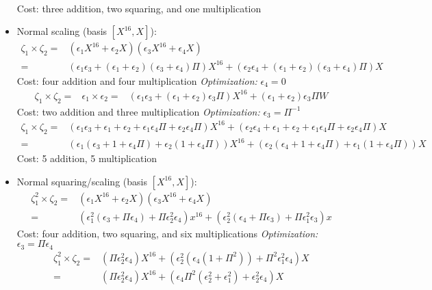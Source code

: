 \begin{itemize}
\begin{align*}
	\end{align*}
	Cost: three addition, two squaring, and one multiplication
	\item Normal scaling (basis $[X^{16}, X]$):
	\begin{align*}
	\zeta_1 \times \zeta_2 = & (\epsilon_1 X^{16} + \epsilon_2 X)(\epsilon_3 X^{16} + \epsilon_4 X) \\
	= & (\epsilon_1\epsilon_3 + (\epsilon_1 + \epsilon_2)(\epsilon_3 + \epsilon_4)\Pi) X^{16} + (\epsilon_2\epsilon_4 + (\epsilon_1 + \epsilon_2)(\epsilon_3 + \epsilon_4)\Pi) X 
	\end{align*}
	Cost: four addition and four multiplication
	\emph{Optimization:} $\epsilon_4 = 0$
	\begin{align*}
	\zeta_1 \times \zeta_2 = & \epsilon_1 \times \epsilon_2 = & (\epsilon_1\epsilon_3 + (\epsilon_1 + \epsilon_2)\epsilon_3\Pi) X^{16} + (\epsilon_1 + \epsilon_2)\epsilon_3\Pi W 
	\end{align*}
	Cost: two addition and three multiplication
	\emph{Optimization:} $\epsilon_3 = \Pi^{-1}$
	\begin{align*}
	\zeta_1 \times \zeta_2 = & (\epsilon_1\epsilon_3 + \epsilon_1 + \epsilon_2 + \epsilon_1\epsilon_4\Pi + \epsilon_2\epsilon_4\Pi) X^{16} + (\epsilon_2\epsilon_4 + \epsilon_1 + \epsilon_2 + \epsilon_1\epsilon_4\Pi + \epsilon_2\epsilon_4\Pi) X \\
	= & (\epsilon_1(\epsilon_3 + 1 + \epsilon_4\Pi) + \epsilon_2(1 + \epsilon_4\Pi)) X^{16} + (\epsilon_2(\epsilon_4 + 1 + \epsilon_4\Pi) + \epsilon_1(1 + \epsilon_4\Pi)) X
	\end{align*} 
	Cost: 5 addition, 5 multiplication %
	\item Normal squaring/scaling (basis $[X^{16}, X]$): 
	\begin{align*}
	\zeta_1^2 \times \zeta_2 = & (\epsilon_1 X^{16} + \epsilon_2 X)(\epsilon_3 X^{16} + \epsilon_4 X) \\
	= & (\epsilon_1^2(\epsilon_3 + \Pi\epsilon_4) + \Pi\epsilon_2^2\epsilon_4) x^{16} + (\epsilon_2^2(\epsilon_4 + \Pi\epsilon_3) + \Pi\epsilon_1^2\epsilon_3) x
	\end{align*}
	Cost: four addition, two squaring, and six multiplications
	\emph{Optimization:} $\epsilon_3 = \Pi\epsilon_4$
	\begin{align*}
	\zeta_1^2 \times \zeta_2 = & (\Pi\epsilon_2^2\epsilon_4) X^{16} + (\epsilon_2^2(\epsilon_4(1 + \Pi^2)) + \Pi^2\epsilon_1^2\epsilon_4) X \\
	= & (\Pi\epsilon_2^2\epsilon_4) X^{16} + (\epsilon_4\Pi^2(\epsilon_2^2 + \epsilon_1^2) + \epsilon_2^2\epsilon_4) X 

\end{align*}
\end{itemize}
